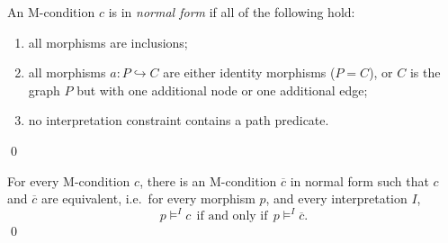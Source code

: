\documentclass{llncs}
\begin{document}
	\begin{definition}\rm
		An M-condition $c$ is in \emph{normal form} if all of the following hold:
		
		\begin{enumerate}
			\item all morphisms are inclusions;
			
			\item all morphisms $a\!:P\hookrightarrow C$ are either identity morphisms ($P=C$), or $C$ is the graph $P$ but with one additional node or one additional edge;
					
			\item no interpretation constraint contains a path predicate.
		\end{enumerate}
		\qed
	\end{definition}
	
	\begin{proposition}\rm
		For every M-condition $c$, there is an M-condition $\overline{c}$ in normal form such that $c$ and $\overline{c}$ are equivalent, i.e.\ for every morphism $p$, and every interpretation $I$,
		\[ p \models^I c\ \ \text{if and only if}\ \ p \models^I \overline{c}. \]
		\qed
	\end{proposition}
	
\end{document}
